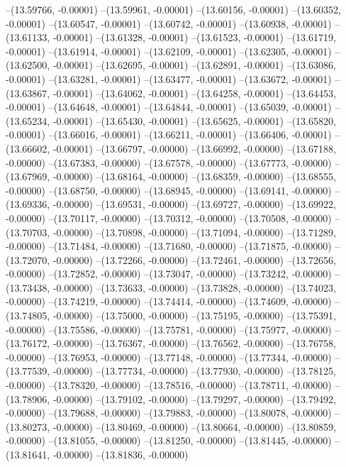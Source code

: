--(13.59766, -0.00001)
--(13.59961, -0.00001)
--(13.60156, -0.00001)
--(13.60352, -0.00001)
--(13.60547, -0.00001)
--(13.60742, -0.00001)
--(13.60938, -0.00001)
--(13.61133, -0.00001)
--(13.61328, -0.00001)
--(13.61523, -0.00001)
--(13.61719, -0.00001)
--(13.61914, -0.00001)
--(13.62109, -0.00001)
--(13.62305, -0.00001)
--(13.62500, -0.00001)
--(13.62695, -0.00001)
--(13.62891, -0.00001)
--(13.63086, -0.00001)
--(13.63281, -0.00001)
--(13.63477, -0.00001)
--(13.63672, -0.00001)
--(13.63867, -0.00001)
--(13.64062, -0.00001)
--(13.64258, -0.00001)
--(13.64453, -0.00001)
--(13.64648, -0.00001)
--(13.64844, -0.00001)
--(13.65039, -0.00001)
--(13.65234, -0.00001)
--(13.65430, -0.00001)
--(13.65625, -0.00001)
--(13.65820, -0.00001)
--(13.66016, -0.00001)
--(13.66211, -0.00001)
--(13.66406, -0.00001)
--(13.66602, -0.00001)
--(13.66797, -0.00000)
--(13.66992, -0.00000)
--(13.67188, -0.00000)
--(13.67383, -0.00000)
--(13.67578, -0.00000)
--(13.67773, -0.00000)
--(13.67969, -0.00000)
--(13.68164, -0.00000)
--(13.68359, -0.00000)
--(13.68555, -0.00000)
--(13.68750, -0.00000)
--(13.68945, -0.00000)
--(13.69141, -0.00000)
--(13.69336, -0.00000)
--(13.69531, -0.00000)
--(13.69727, -0.00000)
--(13.69922, -0.00000)
--(13.70117, -0.00000)
--(13.70312, -0.00000)
--(13.70508, -0.00000)
--(13.70703, -0.00000)
--(13.70898, -0.00000)
--(13.71094, -0.00000)
--(13.71289, -0.00000)
--(13.71484, -0.00000)
--(13.71680, -0.00000)
--(13.71875, -0.00000)
--(13.72070, -0.00000)
--(13.72266, -0.00000)
--(13.72461, -0.00000)
--(13.72656, -0.00000)
--(13.72852, -0.00000)
--(13.73047, -0.00000)
--(13.73242, -0.00000)
--(13.73438, -0.00000)
--(13.73633, -0.00000)
--(13.73828, -0.00000)
--(13.74023, -0.00000)
--(13.74219, -0.00000)
--(13.74414, -0.00000)
--(13.74609, -0.00000)
--(13.74805, -0.00000)
--(13.75000, -0.00000)
--(13.75195, -0.00000)
--(13.75391, -0.00000)
--(13.75586, -0.00000)
--(13.75781, -0.00000)
--(13.75977, -0.00000)
--(13.76172, -0.00000)
--(13.76367, -0.00000)
--(13.76562, -0.00000)
--(13.76758, -0.00000)
--(13.76953, -0.00000)
--(13.77148, -0.00000)
--(13.77344, -0.00000)
--(13.77539, -0.00000)
--(13.77734, -0.00000)
--(13.77930, -0.00000)
--(13.78125, -0.00000)
--(13.78320, -0.00000)
--(13.78516, -0.00000)
--(13.78711, -0.00000)
--(13.78906, -0.00000)
--(13.79102, -0.00000)
--(13.79297, -0.00000)
--(13.79492, -0.00000)
--(13.79688, -0.00000)
--(13.79883, -0.00000)
--(13.80078, -0.00000)
--(13.80273, -0.00000)
--(13.80469, -0.00000)
--(13.80664, -0.00000)
--(13.80859, -0.00000)
--(13.81055, -0.00000)
--(13.81250, -0.00000)
--(13.81445, -0.00000)
--(13.81641, -0.00000)
--(13.81836, -0.00000)
